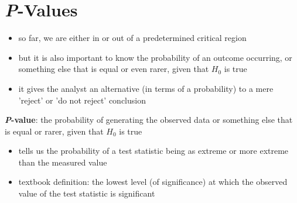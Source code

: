 \documentclass[10pt]{article}
\begin{document}
\section{\textit{P}-Values}
\begin{itemize}
    \item so far, we are either in or out of a predetermined critical region
    \item but it is also important to know the probability of an outcome occurring, or something else that is equal or even rarer, given that $H_0$ is true
    \item it gives the analyst an alternative (in terms of a probability) to a mere 'reject' or 'do not reject' conclusion
\end{itemize}
\begin{definition}
    \textbf{\textit{P}-value}: the probability of generating the observed data or something else that is equal or rarer, given that $H_0$ is true
    \begin{itemize}
        \item tells us the probability of a test statistic being as extreme or more extreme than the measured value
        \item textbook definition: the lowest level (of significance) at which the observed value of the test statistic is significant
    \end{itemize}
\end{definition}
\end{document}
